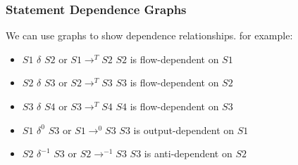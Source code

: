 \subsubsection{Statement Dependence Graphs}
\par We can use graphs to show dependence relationships. for example:\\
\begin{minipage}{0.25\textwidth}
\end{minipage}
\begin{minipage}{0.75\textwidth}
\centering
\end{minipage}
\begin{itemize}
    \item $S1$ $\delta$ $S2$ \quad or \quad $S1 \rightarrow^T S2$ \qquad $S2$ is flow-dependent on $S1$
    \item $S2$ $\delta$ $S3$ \quad or \quad $S2 \rightarrow^T S3$ \qquad $S3$ is flow-dependent on $S2$
    \item $S3$ $\delta$ $S4$ \quad or \quad $S3 \rightarrow^T S4$ \qquad $S4$ is flow-dependent on $S3$
    \item $S1$ $\delta^0$ $S3$ \quad or \quad $S1 \rightarrow^0 S3$ \qquad $S3$ is output-dependent on $S1$
    \item $S2$ $\delta^{-1}$ $S3$ \quad or \quad $S2 \rightarrow^{-1} S3$ \qquad $S3$ is anti-dependent on $S2$
\end{itemize}
